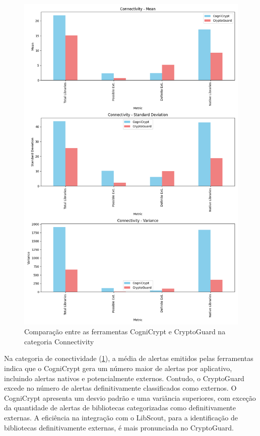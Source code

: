 \begin{figure}[!h]
  \centering
  \includegraphics[scale=0.7]{img/plot_cc_x_cg_connectivity.png}
  \caption{Comparação entre as ferramentas CogniCrypt e CryptoGuard na categoria Connectivity}
  \label{img: CCvsCG_Connectivity}
\end{figure}

Na categoria de conectividade (\ref{img: CCvsCG_Connectivity}), a média de alertas emitidos pelas ferramentas indica que o CogniCrypt gera um número maior de alertas por aplicativo, incluindo alertas nativos e potencialmente externos. Contudo, o CryptoGuard excede no número de alertas definitivamente classificados como externos.
O CogniCrypt apresenta um desvio padrão e uma variância superiores, com exceção da quantidade de alertas de bibliotecas categorizadas como definitivamente externas.
A eficiência na integração com o LibScout, para a identificação de bibliotecas definitivamente externas, é mais pronunciada no CryptoGuard.


